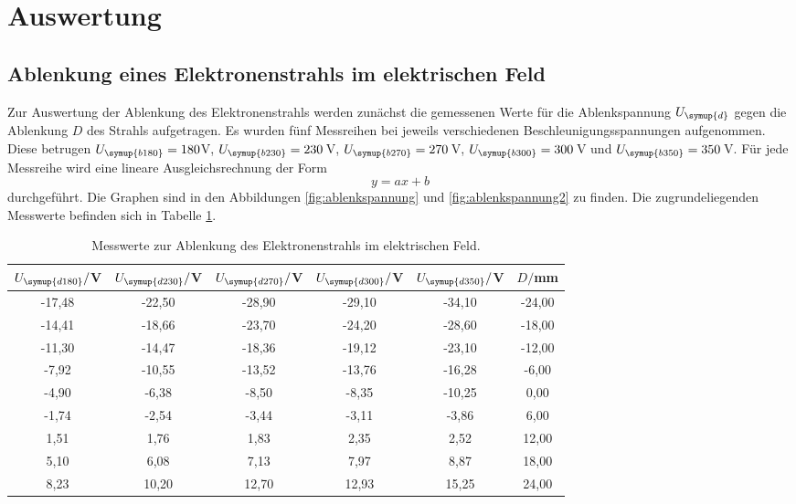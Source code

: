 \section{Auswertung}
\label{sec:Auswertung}


\subsection{Ablenkung eines Elektronenstrahls im elektrischen Feld}
\label{subsec:efeld}


Zur Auswertung der Ablenkung des Elektronenstrahls werden zunächst die gemessenen Werte
für die Ablenkspannung $U_{\symup{d}}$ gegen die Ablenkung $D$ des Strahls aufgetragen.
Es wurden fünf Messreihen bei jeweils verschiedenen Beschleunigungsspannungen aufgenommen.
Diese betrugen $U_{\symup{b180}}=180$V, $U_{\symup{b230}}=230\,$V, $U_{\symup{b270}}=270\,$V,
$U_{\symup{b300}}=300\,$V und $U_{\symup{b350}}=350\,$V.
Für jede Messreihe wird eine lineare Ausgleichsrechnung der Form
\begin{equation*}
  y=a x + b
\end{equation*}
durchgeführt. Die Graphen sind in den Abbildungen \ref{fig:ablenkspannung} und
\ref{fig:ablenkspannung2} zu finden. Die zugrundeliegenden Messwerte befinden sich
in Tabelle \ref{tab:elektrisch}.

\begin{table}[]
	\begin{center}
    \caption{Messwerte zur Ablenkung des Elektronenstrahls im elektrischen Feld.}
    \label{tab:elektrisch}
		\begin{tabular}{cccccc}
		\toprule
			{$U_{\symup{d180}}/$V} & {$U_{\symup{d230}}/$V} & {$U_{\symup{d270}}/$V} & {$U_{\symup{d300}}/$V} & {$U_{\symup{d350}}/$V} & {$D/$mm}\\
			\midrule
			-17,48 & -22,50 & -28,90 & -29,10 & -34,10 & -24,00\\
			-14,41 & -18,66 & -23,70 & -24,20 & -28,60 & -18,00\\
			-11,30 & -14,47 & -18,36 & -19,12 & -23,10 & -12,00\\
			-7,92 & -10,55 & -13,52 & -13,76 & -16,28 & -6,00\\
			-4,90 & -6,38 & -8,50 & -8,35 & -10,25 & 0,00\\
			-1,74 & -2,54 & -3,44 & -3,11 & -3,86 & 6,00\\
			1,51 & 1,76 & 1,83 & 2,35 & 2,52 & 12,00\\
			5,10 & 6,08 & 7,13 & 7,97 & 8,87 & 18,00\\
			8,23 & 10,20 & 12,70 & 12,93 & 15,25 & 24,00\\
		\bottomrule
		\end{tabular}
	\end{center}
\end{table}

